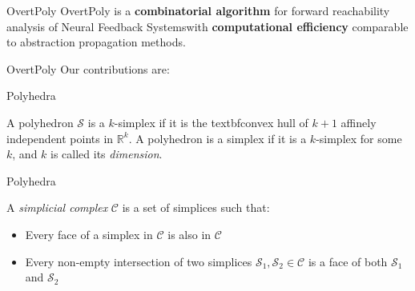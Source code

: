 \begin{frame}[fragile]{OvertPoly}
    OvertPoly is a \textbf{combinatorial algorithm} for forward reachability analysis of Neural Feedback Systemswith \textbf{computational efficiency} comparable to abstraction propagation methods.
\end{frame}

\begin{frame}[fragile]{OvertPoly}
    Our contributions are:
    \begin{itemize}
    \end{itemize}
\end{frame}

\begin{frame}[fragile]{Polyhedra}
    \begin{definition}[$ k $-Simplex]
        A polyhedron $\mathcal{S}$ is a $k$-simplex if it is the textbf{conv}ex hull of $k+1$ affinely independent points in $\mathbb{R}^k$.  A polyhedron is a simplex if it is a $k$-simplex for some $k$, and $k$ is called its \emph{dimension}.
    \end{definition}
\end{frame}

\begin{frame}[fragile]{Polyhedra}
    \begin{definition}
        A \emph{simplicial complex} $\mathcal{C}$ is a set of simplices such that:
        \begin{itemize}
        \item Every face of a simplex in $\mathcal{C}$ is also in $\mathcal{C}$
        \item Every non-empty intersection of two simplices $\mathcal{S}_1,\mathcal{S}_2\in\mathcal{C}$ is a face of both $\mathcal{S}_1$ and $\mathcal{S}_2$
        \end{itemize}
        \end{definition}
\end{frame}

